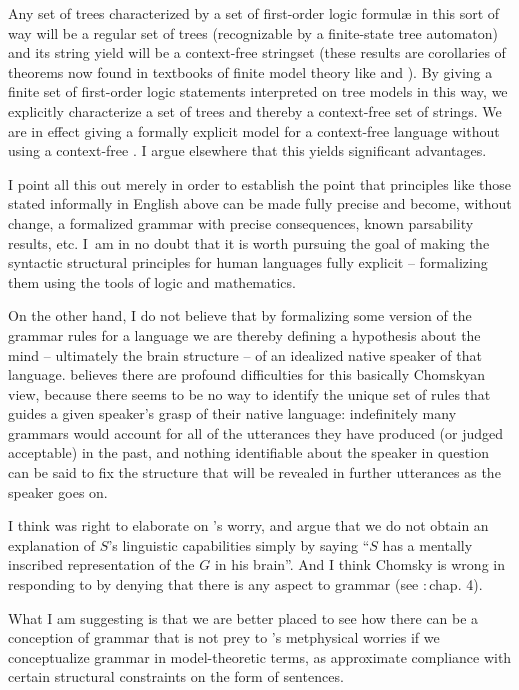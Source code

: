 \documentclass[output=paper]{langscibook}
\begin{document}
Any set of trees characterized by a set of first-order logic formul{\ae} in this sort of way will be a regular set of trees (recognizable by a finite-state tree automaton) and its string yield will be a context-free stringset (these results are corollaries of theorems now found in textbooks of finite model theory like \citealt{EbbiFlum99} and \citealt{Libkin04}). By giving a finite set of first-order logic statements interpreted on tree models in this way, we explicitly characterize a set of trees and thereby a context-free set of strings.  We are in effect giving a formally explicit model for a context-free language without using a context-free .  I argue elsewhere \citep{Pullum13} that this yields significant advantages.

I point all this out merely in order to establish the point that  principles like those stated informally in English above can be made fully precise and become, without change, a formalized grammar with precise consequences, known parsability results, etc. I~am in no doubt that it is worth pursuing the goal of making the syntactic structural principles for human languages fully explicit -- formalizing them using the tools of logic and mathematics.

On the other hand, I do not believe that by formalizing some version of the grammar rules for a language we are thereby defining a hypothesis about the mind -- ultimately the brain structure -- of an idealized native speaker of that language. \citet{Kripke82} believes there are profound difficulties for this basically Chomskyan view, because there seems to be no way to identify the unique set of rules that guides a given speaker's grasp of their native language: indefinitely many grammars would account for all of the utterances they have produced (or judged acceptable) in the past, and nothing identifiable about the speaker in question can be said to fix the structure that will be revealed in further utterances as the speaker goes on.

I think \citet{Scholz90} was right to elaborate on {\Kripke}'s worry, and argue that we do not obtain an explanation of $S$'s linguistic capabilities simply by saying ``$S$ has a mentally inscribed representation of the  $G$ in his brain''. And I think Chomsky is wrong in responding to {\Kripke} by denying that there is any  aspect to grammar (see \citealt{Chomsky86KL}:\,chap. 4).

What I am suggesting is that we are better placed to see how there can be a  conception of grammar that is not prey to {\Kripke}'s metphysical worries if we conceptualize grammar in model-theoretic terms, as approximate compliance with certain structural constraints on the form of sentences.
\end{document}

